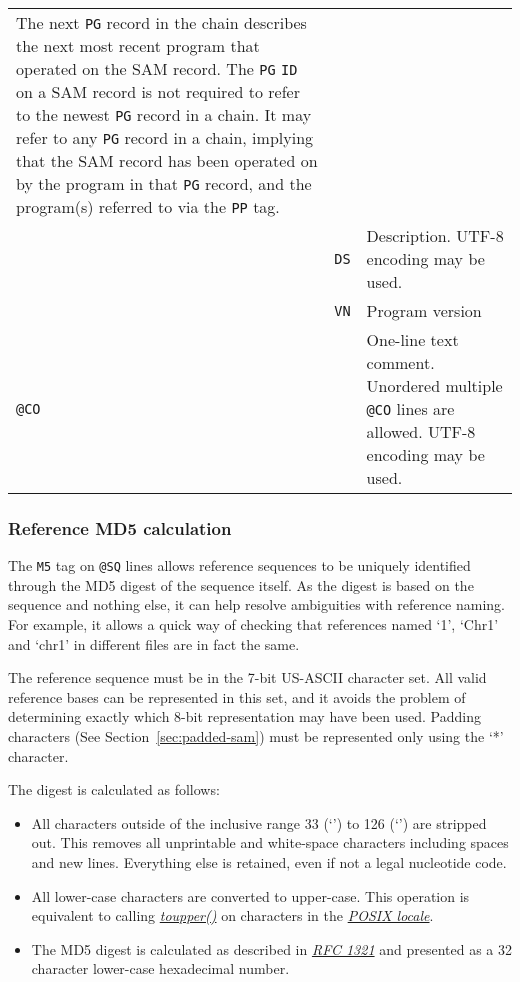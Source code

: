 \documentclass[10pt]{article}
\begin{document}
\begin{center}
\begin{longtable}{|l|l|p{13.5cm}|}
	The next {\tt PG} record in the chain describes the next most recent program that
        operated on the SAM record. The {\tt PG} {\tt ID} on a SAM record is not required
        to refer to the newest {\tt PG} record in a chain.  It may refer to any {\tt PG}
        record in a chain, implying that the SAM record has been operated on by the
        program in that {\tt PG} record, and the program(s) referred to via the {\tt PP} tag. \\\cline{2-3}
  & {\tt DS} & Description.  UTF-8 encoding may be used.\\\cline{2-3}
  & {\tt VN} & Program version \\\cline{1-3}
  \multicolumn{2}{|l}{\tt @CO} & One-line text comment. Unordered multiple {\tt @CO} lines are allowed. UTF-8 encoding may be used.\\
  \cline{1-3}
\end{longtable}
\end{center}

\subsubsection{Reference MD5 calculation}\label{sec:ref-md5}
The {\tt M5} tag on {\tt @SQ} lines allows reference sequences to be uniquely identified through the MD5 digest of the sequence itself.
As the digest is based on the sequence and nothing else, it can help resolve ambiguities with reference naming.
For example, it allows a quick way of checking that references named `1', `Chr1' and `chr1' in different files are in fact the same.

The reference sequence must be in the 7-bit US-ASCII character set.
All valid reference bases can be represented in this set, and it avoids the problem of determining exactly which 8-bit representation may have been used.
Padding characters (See Section~\ref{sec:padded-sam}) must be represented only using the `*' character. 

The digest is calculated as follows:
\begin{itemize}
\item All characters outside of the inclusive range 33 (`') to 126 (`') are stripped out.
This removes all unprintable and white-space characters including spaces and new lines.
Everything else is retained, even if not a legal nucleotide code.
\item All lower-case characters are converted to upper-case.
This operation is equivalent to calling \href{http://pubs.opengroup.org/onlinepubs/9699919799/functions/toupper.html}{\sl toupper()} on characters in the \href{http://pubs.opengroup.org/onlinepubs/9699919799/basedefs/V1\_chap07.html\#tag\_07\_02}{\sl POSIX locale}.
\item The MD5 digest is calculated as described in \href{https://tools.ietf.org/html/rfc1321}{\sl RFC 1321} and presented as a 32 character lower-case hexadecimal number.
\end{itemize}
\end{document}
